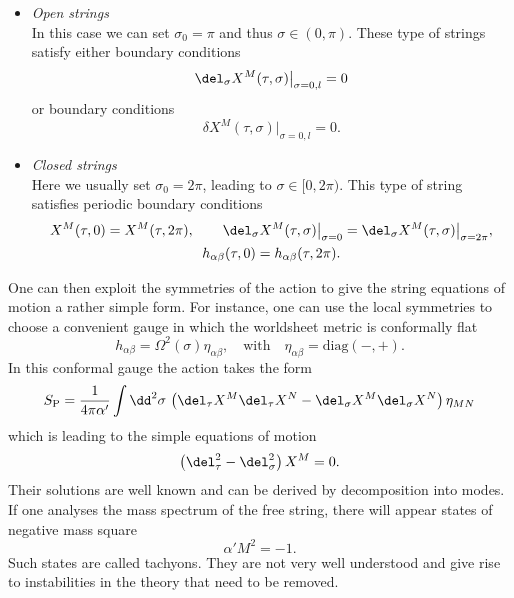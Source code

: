 \begin{itemize}
\item \textit{Open strings}\\[2mm]
In this case we can set $\sigma_{0}=\pi$ and thus $\sigma\in (0,\pi)$. These type of strings satisfy either   boundary conditions
%
\begin{equation}
\del_{\sigma}X^{M}(\tau,\sigma)\big\vert_{\sigma=0,l} = 0
\end{equation}
%
or  boundary conditions
%
\begin{equation}
\delta X^{M}(\tau,\sigma)\big\vert_{\sigma=0,l}=0.
\end{equation}
%
%
\item \textit{Closed strings}\\[2mm]
Here we usually set $\sigma_{0}=2\pi$, leading to $\sigma\in [0,2\pi)$. This type of string satisfies periodic boundary conditions
%
\begin{gather}
X^{M}(\tau,0)=X^{M}(\tau,2\pi), \qquad \del_{\sigma}X^{M}(\tau	,\sigma)\big\vert_{\sigma=0} = \del_{\sigma}X^{M}(\tau	,\sigma)\big\vert_{\sigma=2\pi}, \notag\\ h_{\alpha\beta}(\tau,0)=h_{\alpha\beta}(\tau,2\pi).
\end{gather}
\end{itemize}
%
%
One can then exploit the symmetries of the  action to give the string equations of motion a rather simple form. For instance, one can use the local symmetries to choose a convenient gauge in which the worldsheet metric is conformally flat
%
%
\begin{equation}
h_{\alpha\beta} = \mathit{\Omega}^{2}(\sigma) \eta_{\alpha\beta}, \quad \text{with} \quad \eta_{\alpha\beta} = \text{diag}(-,+).
\end{equation}
%
%
In this conformal gauge the  action takes the form
%
%
\begin{equation}
S_{\rm P} = \frac{1}{4\pi\alpha'} \int \dd^{2}\sigma\, \left(\del_{\tau}X^{M}\del_{\tau}X^{N}-\del_{\sigma}X^{M}\del_{\sigma}X^{N}\right)\eta_{MN}
\end{equation}
%
%
which is leading to the simple equations of motion
%
%
\begin{equation}
\left(\del_{\tau}^{2}-\del_{\sigma}^{2}\right)X^{M}=0.
\end{equation}
%
%
Their solutions are well known and can be derived by decomposition into  modes. If one analyses the mass spectrum of the free string, there will appear states of negative mass square
%
%
\begin{equation}
\alpha' M^{2} = -1.
\end{equation}
%
%
Such states are called tachyons. They are not very well understood and give rise to instabilities in the theory that need to be removed.
%
%
%
%
%
%
%
%
%
%
